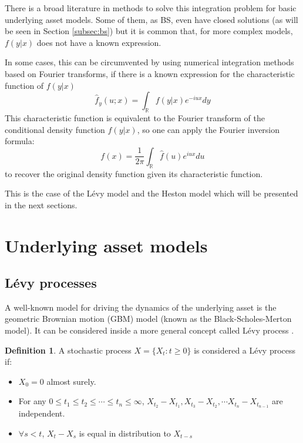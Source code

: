 \documentclass[12,twoside]{mammeTFM}
\theoremstyle{definition}
\newtheorem{definition}[thm]{Definition}
\theoremstyle{remark}
\newcommand{\R}{\ensuremath{\mathbb{R}}}
\begin{document}
There is a broad literature in methods to solve this integration problem for basic underlying asset models. Some of them, as BS, even have closed solutions (as will be seen in Section \ref{subsec:bs}) but it is common that, for more complex models, $f(y|x)$ does not have a known expression.

In some cases, this can be circumvented by using numerical integration methods based on Fourier transforms, if there is a known expression for the characteristic function of $f(y|x)$
\begin{equation}
\hat{f}_y(u;x) = \int_{\R} f(y | x) e^{-iux} dy
\end{equation}
This characteristic function is equivalent to the Fourier transform of the conditional density function $f(y|x)$, so one can apply the Fourier inversion formula:
\begin{equation}
f(x) = \dfrac{1}{2\pi} \int_{\R} \hat{f}(u) e^{iux} du
\end{equation}
to recover the original density function given its characteristic function.

This is the case of the L\'evy model and the Heston model which will be presented in the next sections.

\section{Underlying asset models}\label{chap:underlying_asset_models}
\subsection{L\'evy processes}\label{chapter:levy}
A well-known model for driving the dynamics of the underlying asset is the geometric Brownian motion (GBM) model (known as the Black-Scholes-Merton \cite{bs73, mer73} model). It can be considered inside a more general concept called L\'evy process \cite{sch03}.

\begin{definition} A stochastic process $X = \{X_t : t \geq 0\}$ is considered a L\'evy process if:
\begin{itemize}
\item $X_0 = 0$ almost surely.
\item For any $0 \leq t_1 \leq t_2 \leq \cdots \leq t_n \leq \infty$, $X_{t_2} - X_{t_1}, X_{t_3} - X_{t_2}, \cdots X_{t_n} - X_{t_{n-1}}$ are independent.
\item $\forall s < t$, $X_t - X_s$ is equal in distribution to $X_{t-s}$
\end{itemize}
\end{definition}
\end{document}
